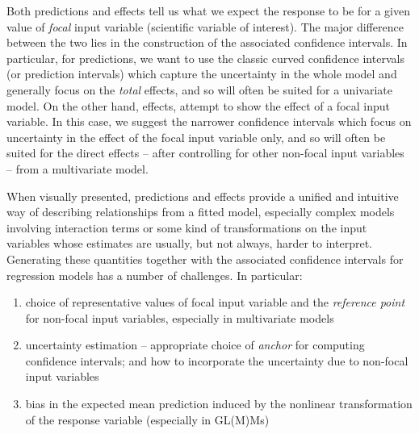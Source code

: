 Both predictions and effects tell us what we expect the response to be for a given value of \emph{focal} input variable (scientific variable of interest). The major difference between the two lies in the construction of the associated confidence intervals. In particular, for predictions, we want to use the classic curved confidence intervals (or prediction intervals) which capture the uncertainty in the whole model and generally focus on the \emph{total} effects, and so will often be suited for a univariate model. On the other hand, effects, attempt to show the effect of a focal input variable. In this case, we suggest the narrower confidence intervals which focus on uncertainty in the effect of the focal input variable only, and so will often be suited for the direct effects – after controlling for other non-focal input variables – from a multivariate model.

When visually presented, predictions and effects provide a unified and intuitive way of describing relationships from a fitted model, especially complex models involving interaction terms or some kind of transformations on the input variables whose estimates are usually, but not always, harder to interpret. Generating these quantities together with the associated confidence intervals for regression models has a number of challenges. In particular:
\begin{enumerate}
\item choice of representative values of focal input variable and the \emph{reference point} for non-focal input variables, especially in multivariate models
\item  uncertainty estimation -- appropriate choice of \emph{anchor} for computing confidence intervals; and how to incorporate the uncertainty due to non-focal input variables 
\item bias in the expected mean prediction induced by the nonlinear transformation of the response variable (especially in GL(M)Ms)
\end{enumerate}

